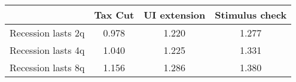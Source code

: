 \begin{tabular}{@{}lccc@{}} 
\toprule 
& Tax Cut    & UI extension    & Stimulus check    \\  \midrule 
Recession lasts 2q &0.978  & 1.220  & 1.277     \\ 
Recession lasts 4q &1.040  & 1.225  & 1.331     \\ 
Recession lasts 8q &1.156  & 1.286  & 1.380     \\ 
\end{tabular}  
